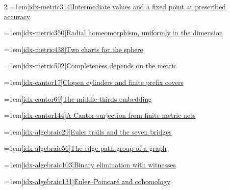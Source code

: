 \begin{multicols}{2}
\noindent\hangindent=1em\hyperref[idx-metric314]{\ref*{idx-metric314}\enspace Intermediate values and a fixed point at prescribed accuracy}\nobreak\dotfill\,\pageref{idx-metric314}\par
\noindent\hangindent=1em\hyperref[idx-metric350]{\ref*{idx-metric350}\enspace Radial homeomorphism, uniformly in the dimension}\nobreak\dotfill\,\pageref{idx-metric350}\par
\noindent\hangindent=1em\hyperref[idx-metric438]{\ref*{idx-metric438}\enspace Two charts for the sphere}\nobreak\dotfill\,\pageref{idx-metric438}\par
\noindent\hangindent=1em\hyperref[idx-metric502]{\ref*{idx-metric502}\enspace Completeness depends on the metric}\nobreak\dotfill\,\pageref{idx-metric502}\par
\par\addvspace{6pt}\par\nobreak
\noindent\hangindent=1em\hyperref[idx-cantor17]{\ref*{idx-cantor17}\enspace Clopen cylinders and finite prefix covers}\nobreak\dotfill\,\pageref{idx-cantor17}\par
\noindent\hangindent=1em\hyperref[idx-cantor69]{\ref*{idx-cantor69}\enspace The middle-thirds embedding}\nobreak\dotfill\,\pageref{idx-cantor69}\par
\noindent\hangindent=1em\hyperref[idx-cantor144]{\ref*{idx-cantor144}\enspace A Cantor surjection from finite metric nets}\nobreak\dotfill\,\pageref{idx-cantor144}\par
\par\addvspace{6pt}\par\nobreak
\noindent\hangindent=1em\hyperref[idx-algebraic29]{\ref*{idx-algebraic29}\enspace Euler trails and the seven bridges}\nobreak\dotfill\,\pageref{idx-algebraic29}\par
\noindent\hangindent=1em\hyperref[idx-algebraic56]{\ref*{idx-algebraic56}\enspace The edge-path group of a graph}\nobreak\dotfill\,\pageref{idx-algebraic56}\par
\noindent\hangindent=1em\hyperref[idx-algebraic103]{\ref*{idx-algebraic103}\enspace Binary elimination with witnesses}\nobreak\dotfill\,\pageref{idx-algebraic103}\par
\noindent\hangindent=1em\hyperref[idx-algebraic131]{\ref*{idx-algebraic131}\enspace Euler--Poincar\'e and cohomology}\nobreak\dotfill\,\pageref{idx-algebraic131}\par

\end{multicols}

